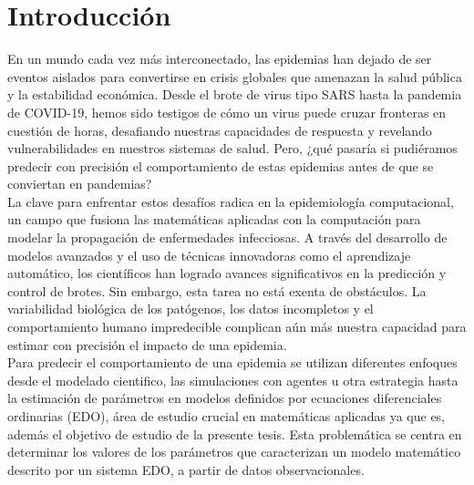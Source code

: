 \chapter*{Introducción}\label{chapter:introduction}

\label{sec:12}

En un mundo cada vez más interconectado, las epidemias han dejado de ser eventos aislados para convertirse en crisis globales que amenazan la salud pública y la estabilidad económica. Desde el brote de virus tipo SARS hasta la pandemia de COVID-19, hemos sido testigos de cómo un virus puede cruzar fronteras en cuestión de horas, desafiando nuestras capacidades de respuesta y revelando vulnerabilidades en nuestros sistemas de salud. Pero, ¿qué pasaría si pudiéramos predecir con precisión el comportamiento de estas epidemias antes de que se conviertan en pandemias? \\

La clave para enfrentar estos desafíos radica en la epidemiología computacional, un campo que fusiona las matemáticas aplicadas con la computación para modelar la propagación de enfermedades infecciosas. A través del desarrollo de modelos avanzados y el uso de técnicas innovadoras como el aprendizaje automático, los científicos han logrado avances significativos en la predicción y control de brotes. Sin embargo, esta tarea no está exenta de obstáculos. La variabilidad biológica de los patógenos, los datos incompletos y el comportamiento humano impredecible complican aún más nuestra capacidad para estimar con precisión el impacto de una epidemia. \\

Para predecir el comportamiento de una epidemia se utilizan diferentes enfoques desde el modelado cientifico, las simulaciones con agentes u otra estrategia hasta la estimación de parámetros en
modelos definidos por ecuaciones diferenciales ordinarias (EDO), área de estudio crucial en matemáticas aplicadas ya que es, además el objetivo de estudio de la presente tesis. Esta problemática se centra en determinar los valores de los parámetros que caracterizan un modelo matemático descrito por un sistema EDO, a partir de datos observacionales. \\

